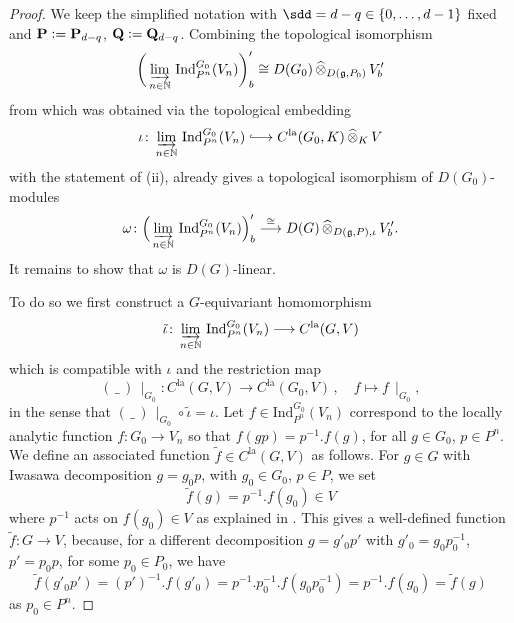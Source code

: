 \documentclass[a4paper, reqno, 10pt]{amsart}
\theoremstyle{definition}
\numberwithin{equation}{section}
\newcommand{\blank}{{\,\_\,}}
\newcommand{\cotimes}[1]{{\,\widehat{\otimes}_{#1}\,}}
\newcommand{\defeq}{\vcentcolon=}
\newcommand{\Ind}{{\mathrm{Ind}}}
\newcommand{\la}{{\mathrm{la}}}
\newcommand{\lra}{\longrightarrow}
\newcommand{\lto}{\longmapsto}
\newcommand{\ra}{\rightarrow}
\newcommand{\res}[1]{{\!\,\mid_{#1}}}
\newcommand{\BN}{{\mathbb {N}}}
\newcommand{\bP}{{\mathrm{\bf P}}}
\newcommand{\bQ}{{\mathrm{\bf Q}}}
\newcommand{\Fg}{{\mathfrak {g}}}
\begin{document}
\begin{proof}
	We keep the simplified notation with $\sdd = d-q \in \{0,\ldots,d-1\}$ fixed and $\bP \defeq \bP_{{d-q}}$, $\bQ \defeq \bQ_{{d-q}}$.
	Combining the topological isomorphism 
	\begin{equation*}
		\bigg(\varinjlim_{n\in\BN}\, \Ind^{G_0}_{P^n} (V_n)\bigg)'_b \cong D(G_0) \cotimes{D(\Fg,P_{0})} V'_b
	\end{equation*}
	from  which was obtained via the topological embedding 
	\begin{equation*} 
		\iota \colon \varinjlim_{n\in\BN}\, \Ind^{G_0}_{P^n} (V_n) \lhook\joinrel\longrightarrow C^\la (G_0,K) \cotimes{K} V
	\end{equation*}
	with the statement of  (ii), already gives a topological isomorphism of $D(G_0)$-modules
	\begin{equation*}
		\omega \colon \Big(\varinjlim_{n\in\BN}\, \Ind^{G_0}_{P^n} (V_n)\Big)'_b \overset{\cong}{\lra} D(G) \cotimes{D(\Fg,P),\iota} V'_b .
	\end{equation*}
	It remains to show that $\omega$ is $D(G)$-linear.
	
	
	To do so we first construct a $G$-equivariant homomorphism 
	\begin{equation*}
		\tilde{\iota} \colon \varinjlim_{n\in\BN}\, \Ind^{G_0}_{P^n} (V_n) \lra C^\la(G,V)
	\end{equation*}
	which is compatible with $\iota$ and the restriction map 
	\begin{equation*}
		(\blank)\res{G_0}\colon C^\la(G,V) \lra C^\la(G_0,V) \,,\quad f \lto f\res{G_0},
	\end{equation*}
	in the sense that $(\blank)\res{G_0} \circ \tilde{\iota}= \iota$.
	Let $f \in \Ind^{G_0}_{P^n} (V_n)$ correspond to the locally analytic function $f\colon G_0 \ra V_n$ so that $f(gp)= p^{-1}. f(g)$, for all $g\in G_0$, $p\in P^n$.
	We define an associated function $\tilde{f} \in C^\la(G,V)$ as follows.
	For $g\in G$ with Iwasawa decomposition $g= g_0 p$, with $g_0 \in G_0$, $p\in P$, we set
	\begin{equation*}
		\tilde{f}(g) = p^{-1}. f(g_0) \in V
	\end{equation*}
	where $p^{-1}$ acts on $f(g_0) \in V$ as explained in .
	This gives a well-defined function $\tilde{f}\colon G \ra V$, because, for a different decomposition $g=g'_0 p'$ with $g'_0 =  g_0 p^{-1}_0$, $p'= p_0 p$, for some $p_0 \in P_0$, we have
	\begin{equation*}
		\tilde{f}(g'_0 p') = (p')^{-1} . f(g'_0) = p^{-1} .p_0^{-1}. f( g_0 p^{-1}_0) = p^{-1} . f(g_0) = \tilde{f}(g) 
	\end{equation*}
	as $p_0 \in P^n$.
	

\end{proof}
\end{document}

